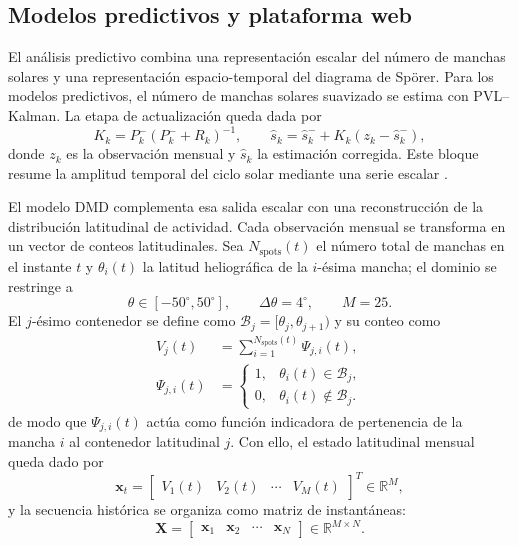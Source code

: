 \documentclass[a4paper,twocolumn,11pt]{article}
\begin{document}
\subsection{Modelos predictivos y plataforma web}
El análisis predictivo combina una representación escalar del número de manchas solares y una representación espacio-temporal del diagrama de Spörer. Para los modelos predictivos, el número de manchas solares suavizado se estima con PVL--Kalman. La etapa de actualización queda dada por
\begin{equation}
K_k=P_k^{-}(P_k^{-}+R_k)^{-1}, \qquad
\widehat{s}_k=\widehat{s}_k^{-}+K_k(z_k-\widehat{s}_k^{-}),
\end{equation}
donde $z_k$ es la observación mensual y $\widehat{s}_k$ la estimación corregida. Este bloque resume la amplitud temporal del ciclo solar mediante una serie escalar \citep{kalman1960newapproach,podladchikova2012kalman}.

El modelo DMD complementa esa salida escalar con una reconstrucción de la distribución latitudinal de actividad. Cada observación mensual se transforma en un vector de conteos latitudinales. Sea $N_{\mathrm{spots}}(t)$ el número total de manchas en el instante $t$ y $\theta_i(t)$ la latitud heliográfica de la $i$-ésima mancha; el dominio se restringe a
\begin{equation}
\theta\in[-50^{\circ},50^{\circ}], \qquad \Delta\theta=4^{\circ}, \qquad M=25.
\end{equation}
El $j$-ésimo contenedor se define como $\mathcal{B}_j=[\theta_j,\theta_{j+1})$ y su conteo como
\begin{align}
V_j(t)&=\sum_{i=1}^{N_{\mathrm{spots}}(t)}\Psi_{j,i}(t),\\
\Psi_{j,i}(t)&=
\begin{cases}
1, & \theta_i(t)\in\mathcal{B}_j,\\
0, & \theta_i(t)\notin\mathcal{B}_j.
\end{cases}
\end{align}
de modo que $\Psi_{j,i}(t)$ actúa como función indicadora de pertenencia de la mancha $i$ al contenedor latitudinal $j$. Con ello, el estado latitudinal mensual queda dado por
\begin{equation}
\mathbf{x}_t=\begin{bmatrix}V_1(t)&V_2(t)&\cdots&V_M(t)\end{bmatrix}^{T}\in\mathbb{R}^{M},
\end{equation}
y la secuencia histórica se organiza como matriz de instantáneas:
\begin{equation}
\mathbf{X}=\begin{bmatrix}\mathbf{x}_1&\mathbf{x}_2&\cdots&\mathbf{x}_N\end{bmatrix}\in\mathbb{R}^{M\times N}.
\end{equation}
\end{document}
